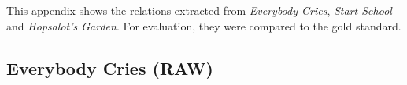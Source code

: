 %
%
%                 

\label{sec:appendixtruerel}

This appendix shows the relations extracted from \textit{Everybody Cries}, \textit{Start School} and \textit{Hopsalot's Garden}. For evaluation, they were compared to the gold standard.

\subsection{Everybody Cries (RAW)}

